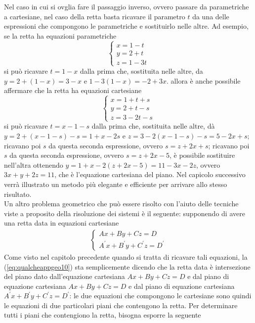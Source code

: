 \begin{oss}
  \label{oss:qualcheappgeo4}
  Nel caso in cui si ovglia fare il passaggio inverso, ovvero passare da parametriche a cartesiane, nel
  caso della retta basta ricavare il parametro $t$ da una delle espressioni che compongono le
  parametriche e sostituirlo nelle altre. Ad esempio, se la retta ha equazioni parametriche
  \begin{equation*}
    \begin{cases}
      x=1-t\\
      y=2+t\\
      z=1-3t
    \end{cases}
  \end{equation*}
  si può ricavare $t=1-x$ dalla prima che, sostituita nelle altre, da $y=2+(1-x)=3-x$ e
  $1-3 (1-x)=-2+3x$. allora è anche possibile affermare che la retta ha equazioni cartesiane
  \begin{equation*}
    \begin{cases}
      x=1+t+s\\
      y=2+t-s\\
      z=3-2t-s
    \end{cases}
  \end{equation*}
  si può ricavare $t=x-1-s$ dalla prima che, sostituita nelle altre, dà $y=2+(x-1-s)-s=1+x-2s$ e
  $z=3-2(x-1-s)-s=5-2x+s$; ricavano poi $s$ da questa seconda espressione, ovvero $s=z+2x+s$; ricavano
  poi $s$ da questa seconda espressione, ovvero $s=z+2x-5$, è possibile sostituire nell'altra
  ottenendo $y=1+x-2(z+2x-5)=11-3x-2z$, ovvero $3x+y+2z=11$, che è l'equazione cartesiana del piano.
  Nel capicolo successivo verrà illustrato un metodo più elegante e efficiente per arrivare allo stesso
  risultato.\\
  Un altro problema geometrico che può essere risolto con l'aiuto delle tecniche viste a proposito della
  risoluzione dei sistemi è il seguente: supponendo di avere una retta data in equazioni cartesiane
  \begin{eqnarray}
    \label{eq:qualcheappgeo10}
    \begin{cases}
      Ax+By+Cz=D\\
      A^\prime x+B^\prime y+C^\prime z =D^\prime
    \end{cases}
  \end{eqnarray}
  Come visto nel capitolo precedente quando si tratta di ricavare tali equazioni, la
  (\ref{eq:qualcheappgeo10}) sta semplicemente dicendo che la retta data è intersezione del piano dato
  dall'equazione cartesiana $Ax+By+Cz=D$ e dal piano di equazione cartesiana $Ax+By+Cz=D$ e dal piano
  di equazione cartesiana $A^\prime x+B^\prime y+C^\prime z =D^\prime$: le due equazioni che compongono
  le cartesiane sono quindi le equazioni di due particolari piani che contengono la retta.
  Per determinare tutti i piani che contengiono la retta, bisogna esporre la seguente
\end{oss}
